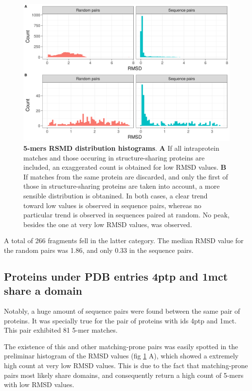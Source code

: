 \documentclass[a4paper, 11pt]{article} %
\begin{document}
\begin{figure}[!h]
\begin{framed}
\centering
\includegraphics[width = \textwidth]{../plots/histogram.png}
\caption{\textbf{5-mers RSMD distribution histograms}. \textbf{A} If all intraprotein matches and those occuring in structure-sharing proteins are included, an exaggerated count is obtained for low RMSD values. \textbf{B} If matches from the same protein are discarded, and only the first of those in structure-sharing proteins are taken into account, a more sensible distribution is obtanined. In both cases, a clear trend toward low values is observed in sequence pairs, whereas no particular trend is observed in sequences paired at random. No peak, besides the one at very low RMSD values, was observed.}
\label{fig:hist}
\end{framed}
\end{figure}

A total of 266 fragments fell in the latter category. The median RMSD value for the random pairs was 1.86, and only 0.33 in the sequence pairs.

\subsection{Proteins under PDB entries 4ptp and 1mct share a domain}

Notably, a huge amount of sequence pairs were found between the same pair of proteins. It was specially true for the pair of proteins with ids 4ptp and 1mct. This pair exhibited 81 5-mer matches. 

The existence of this and other matching-prone pairs was easily spotted in the preliminar histogram of the RMSD values (fig \ref{fig:hist} A), which showed a extremely high count at very low RMSD values. This is due to the fact that matching-prone pairs most likely share domains, and consequently return a high count of 5-mers with low RMSD values.
\end{document}
